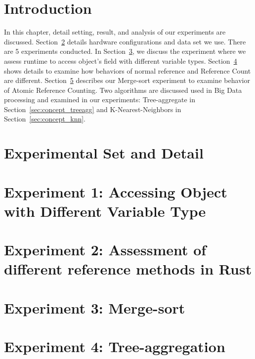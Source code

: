 \section{Introduction}
\label{sec:eval_intro}
In this chapter, detail setting, result, and analysis of our experiments are discussed.
Section~\ref{sec:eval_setdetail} details hardware configurations and data set we use. 
There are 5 experiments conducted. In Section~\ref{sec:eval_diffval}, we discuss the experiment 
where we assess runtime to access object's field with different variable types. 
Section~\ref{sec:eval_refcount} shows details to examine how behaviors of normal reference and Reference Count are different. 
Section~\ref{sec:eval_sort} describes our Merge-sort experiment to examine behavior of Atomic Reference Counting.
Two algorithms are discussed used in Big Data processing and examined in our experiments: 
Tree-aggregate in Section~\ref{sec:concept_treeagg} and K-Nearest-Neighbors in Section~\ref{sec:concept_knn}.

\section{Experimental Set and Detail}
\label{sec:eval_setdetail}


\section{Experiment 1: Accessing Object with Different Variable Type}
\label{sec:eval_diffval}


\section{Experiment 2: Assessment of different reference methods in Rust}
\label{sec:eval_refcount}


\section{Experiment 3: Merge-sort}
\label{sec:eval_sort}



\section{Experiment 4: Tree-aggregation}
\label{sec:eval_treeagg}


